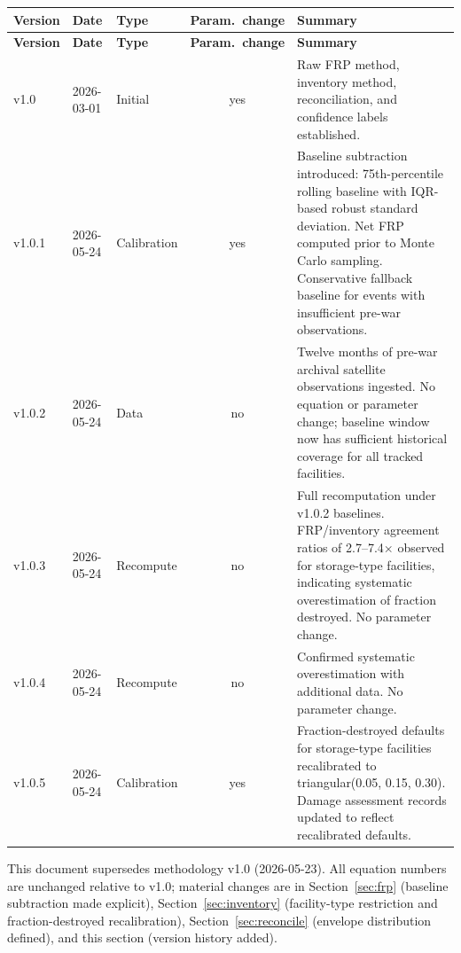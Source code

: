\documentclass[11pt]{article}
\begin{document}
\begin{longtable}{@{}lllcp{6.5cm}@{}}
\toprule
\textbf{Version} & \textbf{Date} & \textbf{Type}
  & \textbf{Param.\ change} & \textbf{Summary} \\
\midrule
\endfirsthead
\toprule
\textbf{Version} & \textbf{Date} & \textbf{Type}
  & \textbf{Param.\ change} & \textbf{Summary} \\
\midrule
\endhead
\bottomrule
\endfoot
v1.0
  & 2026-03-01 & Initial & yes
  & Raw FRP method, inventory method, reconciliation, and confidence
    labels established. \\[4pt]
v1.0.1
  & 2026-05-24 & Calibration & yes
  & Baseline subtraction introduced: 75th-percentile rolling baseline
    with IQR-based robust standard deviation. Net FRP computed prior to
    Monte Carlo sampling. Conservative fallback baseline for events with
    insufficient pre-war observations. \\[4pt]
v1.0.2
  & 2026-05-24 & Data & no
  & Twelve months of pre-war archival satellite observations ingested.
    No equation or parameter change; baseline window now has sufficient
    historical coverage for all tracked facilities. \\[4pt]
v1.0.3
  & 2026-05-24 & Recompute & no
  & Full recomputation under v1.0.2 baselines. FRP/inventory agreement
    ratios of 2.7--7.4$\times$ observed for storage-type facilities,
    indicating systematic overestimation of fraction destroyed. No
    parameter change. \\[4pt]
v1.0.4
  & 2026-05-24 & Recompute & no
  & Confirmed systematic overestimation with additional data. No parameter
    change. \\[4pt]
v1.0.5
  & 2026-05-24 & Calibration & yes
  & Fraction-destroyed defaults for storage-type facilities recalibrated
    to triangular(0.05, 0.15, 0.30). Damage assessment records updated
    to reflect recalibrated defaults. \\
\bottomrule
\end{longtable}

\noindent This document supersedes methodology v1.0 (2026-05-23). All
equation numbers are unchanged relative to v1.0; material changes are in
Section~\ref{sec:frp} (baseline subtraction made explicit),
Section~\ref{sec:inventory} (facility-type restriction and
fraction-destroyed recalibration), Section~\ref{sec:reconcile} (envelope
distribution defined), and this section (version history added).

\end{document}

